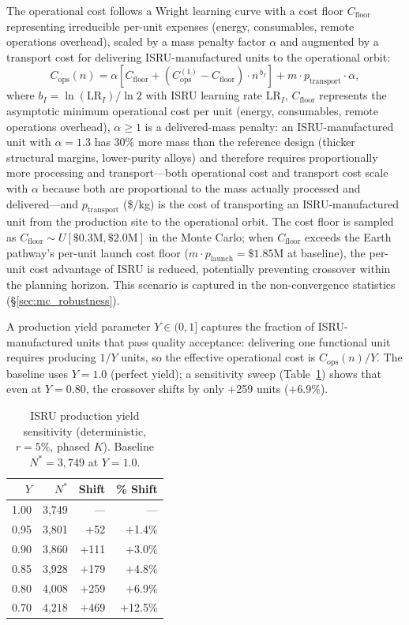 \documentclass[preprint,12pt]{elsarticle}
\begin{document}
The operational cost follows a Wright learning curve with a cost floor $C_{\mathrm{floor}}$ representing irreducible per-unit expenses (energy, consumables, remote operations overhead), scaled by a mass penalty factor $\alpha$ and augmented by a transport cost for delivering ISRU-manufactured units to the operational orbit:
\begin{equation}
  C_{\mathrm{ops}}(n) = \alpha \left[ C_{\mathrm{floor}} + \left(C_{\mathrm{ops}}^{(1)} - C_{\mathrm{floor}}\right) \cdot n^{\,b_I} \right] + m \cdot p_{\mathrm{transport}} \cdot \alpha,
  \label{eq:isru_ops}
\end{equation}
where $b_I = \ln(\mathrm{LR}_I)/\ln 2$ with ISRU learning rate $\mathrm{LR}_I$, $C_{\mathrm{floor}}$ represents the asymptotic minimum operational cost per unit (energy, consumables, remote operations overhead), $\alpha \geq 1$ is a delivered-mass penalty: an ISRU-manufactured unit with $\alpha = 1.3$ has 30\% more mass than the reference design (thicker structural margins, lower-purity alloys) and therefore requires proportionally more processing and transport---both operational cost and transport cost scale with $\alpha$ because both are proportional to the mass actually processed and delivered---and $p_{\mathrm{transport}}$ (\$/kg) is the cost of transporting an ISRU-manufactured unit from the production site to the operational orbit. The cost floor is sampled as $C_{\mathrm{floor}} \sim U[\$0.3\text{M}, \$2.0\text{M}]$ in the Monte Carlo; when $C_{\mathrm{floor}}$ exceeds the Earth pathway's per-unit launch cost floor ($m \cdot p_{\mathrm{launch}} = \$1.85$M at baseline), the per-unit cost advantage of ISRU is reduced, potentially preventing crossover within the planning horizon. This scenario is captured in the non-convergence statistics (\S\ref{sec:mc_robustness}).

A production yield parameter $Y \in (0, 1]$ captures the fraction of ISRU-manufactured units that pass quality acceptance: delivering one functional unit requires producing $1/Y$ units, so the effective operational cost is $C_{\mathrm{ops}}(n)/Y$. The baseline uses $Y = 1.0$ (perfect yield); a sensitivity sweep (Table~\ref{tab:yield_sensitivity}) shows that even at $Y = 0.80$, the crossover shifts by only $+$259 units ($+$6.9\%).

\begin{table}[htbp]
\centering
\caption{ISRU production yield sensitivity (deterministic, $r = 5\%$, phased $K$). Baseline $N^* = 3{,}749$ at $Y = 1.0$.}
\label{tab:yield_sensitivity}
\small
\begin{tabular}{@{}rrrr@{}}
\toprule
$Y$ & $N^*$ & Shift & \% Shift \\
\midrule
1.00 & 3{,}749 & --- & --- \\
0.95 & 3{,}801 & $+$52  & $+$1.4\% \\
0.90 & 3{,}860 & $+$111 & $+$3.0\% \\
0.85 & 3{,}928 & $+$179 & $+$4.8\% \\
0.80 & 4{,}008 & $+$259 & $+$6.9\% \\
0.70 & 4{,}218 & $+$469 & $+$12.5\% \\
\bottomrule
\end{tabular}
\end{table}
\end{document}
